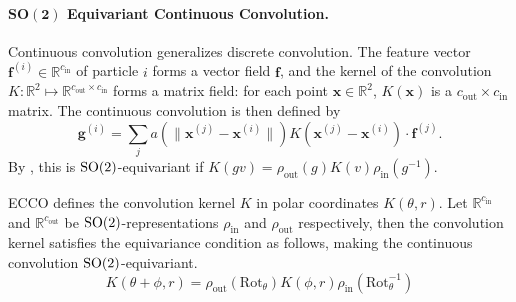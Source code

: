 \paragraph{\texorpdfstring{$\mathbf{SO(2)}$}{SO(2)} Equivariant Continuous Convolution.}
Continuous convolution \cite{ummenhofer2019lagrangian} generalizes discrete convolution. The feature vector $\mathbf{f}^{(i)} \in \mathbb{R}^{c_\mathrm{in}}$ of particle $i$ forms a vector field $\mathbf{f}$, and the kernel of the convolution $K: \mathbb{R}^2 \mapsto \mathbb{R}^{c_\mathrm{out}\times c_\mathrm{in}}$ forms a matrix field: for each point $\mathbf{x} \in \mathbb{R}^2$, $K(\mathbf{x})$ is a $c_\mathrm{out}\times c_\mathrm{in}$ matrix. The continuous convolution is then defined by 
\[
 \mathbf{g}^{(i)} = \sum_j a(\|\mathbf{x}^{(j)} - \mathbf{x}^{(i)}\|) K(\mathbf{x}^{(j)} - \mathbf{x}^{(i)}) \cdot \mathbf{f}^{(j)}.
\]
By \cite{weiler2019e2cnn}, this is $\mathrm{SO}(2)$-equivariant if 
$
K(gv) = \rho_\mathrm{out}(g) K(v) \rho_\mathrm{in}(g^{-1})$.

ECCO \cite{ecco} defines the convolution kernel $K$ in polar coordinates $K(\theta, r)$. Let $\mathbb{R}^{c_\mathrm{in}}$ and $\mathbb{R}^{c_\mathrm{out}}$ be $\mathrm{SO}(2)$-representations $\rho_\mathrm{in}$ and $\rho_\mathrm{out}$ respectively, then the convolution kernel satisfies the equivariance condition as follows, making the continuous convolution $\mathrm{SO}(2)$-equivariant.
\[
 K(\theta + \phi, r) = \rho_\mathrm{out}(\mathrm{Rot}_\theta) K(\phi,r)\rho_\mathrm{in}(\mathrm{Rot}_\theta^{-1})
\]




